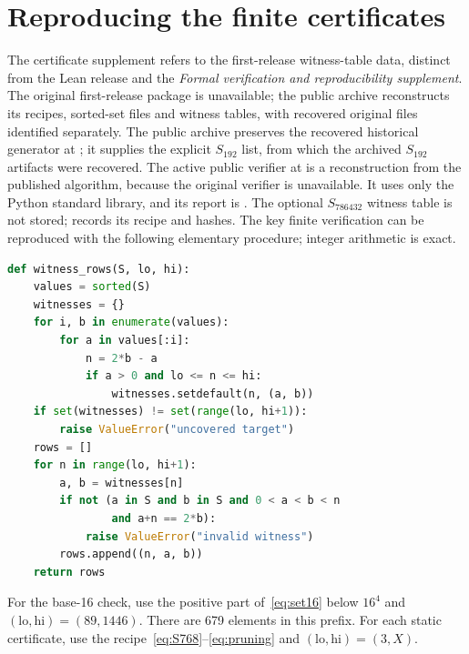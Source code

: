 \documentclass[11pt]{article}
\theoremstyle{definition}\newtheorem{definition}[theorem]{Definition}
\theoremstyle{remark}\newtheorem{remark}[theorem]{Remark}
\numberwithin{equation}{section}
\begin{document}
\section{Reproducing the finite certificates}\label{app:cert}
The certificate supplement refers to the first-release witness-table data, distinct from the Lean release and the \emph{Formal verification and reproducibility supplement}. The original first-release package is unavailable; the public archive reconstructs its recipes, sorted-set files and witness tables, with recovered original files identified separately. The public archive preserves the recovered historical generator at ; it supplies the explicit $S_{192}$ list, from which the archived $S_{192}$ artifacts were recovered. The active public verifier at  is a reconstruction from the published algorithm, because the original verifier is unavailable. It uses only the Python standard library, and its report is . The optional $S_{786432}$ witness table is not stored;  records its recipe and hashes. The key finite verification can be reproduced with the following elementary procedure; integer arithmetic is exact.
\begin{lstlisting}[language=Python]
def witness_rows(S, lo, hi):
    values = sorted(S)
    witnesses = {}
    for i, b in enumerate(values):
        for a in values[:i]:
            n = 2*b - a
            if a > 0 and lo <= n <= hi:
                witnesses.setdefault(n, (a, b))
    if set(witnesses) != set(range(lo, hi+1)):
        raise ValueError("uncovered target")
    rows = []
    for n in range(lo, hi+1):
        a, b = witnesses[n]
        if not (a in S and b in S and 0 < a < b < n
                and a+n == 2*b):
            raise ValueError("invalid witness")
        rows.append((n, a, b))
    return rows
\end{lstlisting}
For the base-16 check, use the positive part of~\eqref{eq:set16} below $16^4$ and $(\mathrm{lo},\mathrm{hi})=(89,1446)$. There are 679 elements in this prefix. For each static certificate, use the recipe~\eqref{eq:S768}--\eqref{eq:pruning} and $(\mathrm{lo},\mathrm{hi})=(3,X)$.
\end{document}
